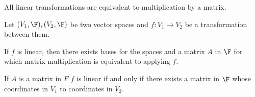 

All linear transformations are equivalent to multiplication by a matrix.


\begin{prop}

Let $(V_1, \F), (V_2, \F)$ be two vector spaces and $f: V_1 \to V_2$ be a transformation between them.

If $f$ is linear, then there exists bases for the spaces and a matrix $A$ in $\F$ for which matrix multiplication is equivalent to applying $f$.

If $A$ is a matrix in $F$ $f$ is linear if and only if there exists a matrix in $\F$ whose coordinates in $V_1$ to coordinates in $V_2$.

\end{prop}
